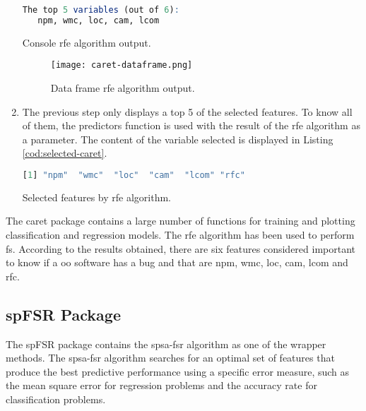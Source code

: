 \begin{enumerate}
\begin{codefloat}[H]
\begin{lstlisting}[language=R, style=console]
The top 5 variables (out of 6):
   npm, wmc, loc, cam, lcom
\end{lstlisting}
\caption{Console \acrshort{rfe} algorithm output.}
\label{cod:caret-console}
\end{codefloat}

    \begin{figure}[H]
        \centering
        \texttt{[image: caret-dataframe.png]}
        \caption{Data frame \acrshort{rfe} algorithm output.}
        \label{fig:caret-dataframe}
    \end{figure}
    
    \item The previous step only displays a top 5 of the selected features. To know all of them, the predictors function is used with the result of the rfe algorithm as a parameter. The content of the variable selected is displayed in Listing \ref{cod:selected-caret}.
    
\begin{codefloat}[H]
\begin{lstlisting}[language=R, style=console]
[1] "npm"  "wmc"  "loc"  "cam"  "lcom" "rfc" 
\end{lstlisting}
\caption{Selected features by \acrshort{rfe} algorithm.}
\label{cod:selected-caret}
\end{codefloat}
    
\end{enumerate}

The caret package contains a large number of functions for training and plotting classification and regression models. The \acrshort{rfe} algorithm has been used to perform \acrshort{fs}. According to the results obtained, there are six features considered important to know if a \acrshort{oo} software has a bug and that are \acrfull{npm}, \acrfull{wmc}, \acrfull{loc}, \acrfull{cam}, \acrfull{lcom} and \acrfull{rfc}.

\subsection{spFSR Package}
\label{sec:spfsr-package}

The spFSR package \cite{spfsr} contains the \acrfull{spsa-fsr} algorithm as one of the wrapper methods. The \acrshort{spsa-fsr} algorithm searches for an optimal set of features that produce the best predictive performance using a specific error measure, such as the mean square error for regression problems and the accuracy rate for classification problems.

